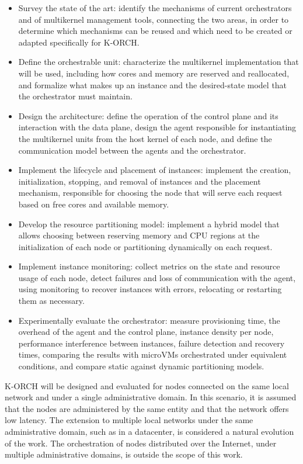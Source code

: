 \documentclass[12pt]{article}
\begin{document}
\begin{itemize}
  \item Survey the state of the art: identify the mechanisms of current orchestrators and of multikernel management
  tools, connecting the two areas, in order to determine which mechanisms can be reused and which
  need to be created or adapted specifically for K-ORCH.
  \item Define the orchestrable unit: characterize the multikernel implementation that will be used, including how
  cores and memory are reserved and reallocated, and formalize what makes up an instance and the desired-state model
  that the orchestrator must maintain.
  \item Design the architecture: define the operation of the control plane and its interaction with the data plane,
  design the agent responsible for instantiating the multikernel units from the host kernel of each node,
  and define the communication model between the agents and the orchestrator.
  \item Implement the lifecycle and placement of instances: implement the creation, initialization, stopping, and
  removal of instances and the placement mechanism, responsible for choosing the node that will serve
  each request based on free cores and available memory.
  \item Develop the resource partitioning model: implement a hybrid model that allows choosing between reserving memory and CPU regions at
  the initialization of each node or partitioning dynamically on each request.
  \item Implement instance monitoring: collect metrics on the state and resource usage of each node,
  detect failures and loss of communication with the agent, using monitoring to recover instances with errors,
  relocating or restarting them as necessary.
  \item Experimentally evaluate the orchestrator: measure provisioning time, the overhead of the agent and the
  control plane, instance density per node, performance interference between instances, failure detection and
  recovery times, comparing the results with microVMs orchestrated under equivalent conditions, and compare static
  against dynamic partitioning models.
\end{itemize}

K-ORCH will be designed and evaluated for nodes connected on the same local network and under a single administrative domain.
In this scenario, it is assumed that the nodes are administered by the same entity and that the network offers low latency.
The extension to multiple local networks under the same administrative domain, such as in a datacenter, is considered
a natural evolution of the work.
The orchestration of nodes distributed over the Internet, under multiple administrative domains, is outside the
scope of this work.
\end{document}
